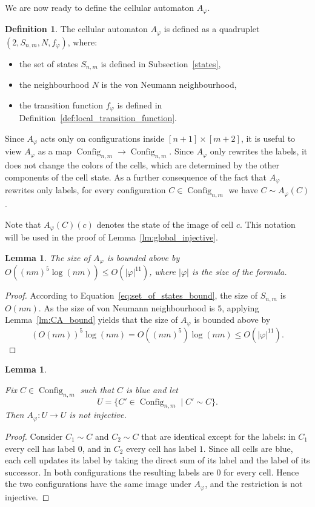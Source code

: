 \documentclass{article}
\theoremstyle{plain}
\newtheorem{lemma}[theorem]{Lemma}
\theoremstyle{definition}
\newtheorem{definition}[theorem]{Definition}
\DeclareMathOperator{\Config}{Config}
\begin{document}
 We are now ready to define the cellular automaton $A_\varphi$.

\begin{definition}\label{def:A_varphi}
    The cellular automaton $A_\varphi$ is defined as a quadruplet \linebreak$(2, S_{n,m}, N, f_\varphi)$, where:
    \begin{itemize}
        \item the set of states $S_{n,m}$ is defined in Subsection~\ref{states},
        \item the neighbourhood $N$ is the von Neumann neighbourhood,
        \item the transition function $f_\varphi$ is defined in Definition~\ref{def:local_transition_function}.
    \end{itemize}
\end{definition}

Since $A_\varphi$ acts only on configurations inside $[n+1]\times[m+2]$, it is useful to view $A_\varphi$ as a map $\Config_{n,m} \rightarrow \Config_{n,m}$. 
Since $A_\varphi$ only rewrites the labels, it does not change the colors of the cells, which are determined by the other components of the cell state. 
As a further consequence of the fact that $A_\varphi$ rewrites only labels, for every configuration $C \in \Config_{n,m}$ we have $C \sim A_\varphi(C)$.

Note that $A_\varphi(C)(c)$ denotes the state of the image of cell $c$. This notation will be used in the proof of Lemma~\ref{lm:global_injective}.


\begin{lemma}
    The size of $A_\varphi$ is bounded above by
$O((n m)^5 \log(nm)) \le O(|\varphi|^{11})$, where $|\varphi|$ is the size of the formula.
\end{lemma}

\begin{proof}
According to Equation~\ref{eq:set_of_states_bound}, the size of $S_{n,m}$ is $O(nm)$. As the size of von Neumann neighbourhood is $5$, applying Lemma~\ref{lm:CA_bound} yields that the size of $A_\varphi$ is bounded above by
\[
(O(nm))^5 \log(nm) = O((nm)^5)\log(nm) \leq O(|\varphi|^{11}).
\]
\end{proof}




\begin{lemma}\label{lm:blue_table}

 Fix $C \in \Config_{n,m}$ such that $C$ is blue and let
 \[
 U = \{C' \in \Config_{n,m} \mid C' \sim C\}.
 \]
 Then $A_\varphi : U\to U$ is not injective.
\end{lemma}
\begin{proof}
Consider $C_1\sim C$ and $C_2 \sim C$  that are identical except for the labels:
in $C_1$ every cell has label $0$, and in $C_2$ every cell has label $1$.
Since all cells are blue, each cell updates its label by taking the direct sum of its label and the label of its successor.
In both configurations the resulting labels are $0$ for every cell.
Hence the two configurations have the same image under $A_\varphi$, and the restriction is not injective.
\end{proof}
\end{document}
